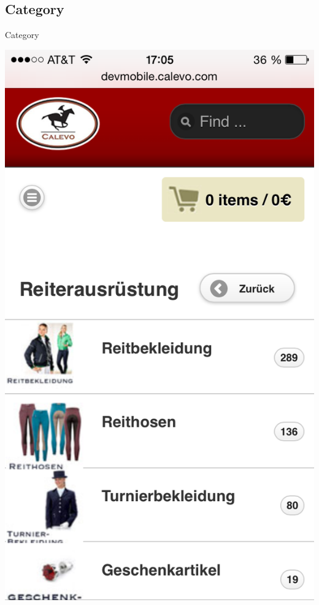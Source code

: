 \subsection{Category}
\begin{frame}[plain]{Category}
\begin{center}
  \includegraphics[width=\textwidth,height=1\textheight,keepaspectratio]{pics/category.png}
\end{center}
\end{frame}


